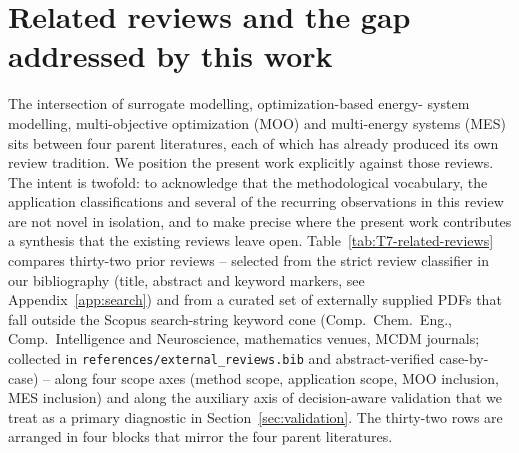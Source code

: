 \section{Related reviews and the gap addressed by this work}
\label{sec:related-reviews}

The intersection of surrogate modelling, optimization-based energy-
system modelling, multi-objective optimization (MOO) and multi-energy
systems (MES) sits between four parent literatures, each of which has
already produced its own review tradition. We position the present
work explicitly against those reviews. The intent is twofold: to
acknowledge that the methodological vocabulary, the application
classifications and several of the recurring observations in this
review are not novel in isolation, and to make precise where the
present work contributes a synthesis that the existing reviews leave
open. Table~\ref{tab:T7-related-reviews} compares thirty-two prior
reviews -- selected from the strict review classifier in our
bibliography (title, abstract and keyword markers, see
Appendix~\ref{app:search}) and from a curated set of externally
supplied PDFs that fall outside the Scopus search-string keyword cone
(Comp.~Chem.~Eng., Comp.~Intelligence and Neuroscience,
mathematics venues, MCDM journals; collected in
\texttt{references/external\_reviews.bib} and abstract-verified
case-by-case) -- along four scope axes (method scope, application
scope, MOO inclusion, MES inclusion) and along the auxiliary axis of
decision-aware validation that we treat as a primary diagnostic in
Section~\ref{sec:validation}. The thirty-two rows are arranged in
four blocks that mirror the four parent literatures.

